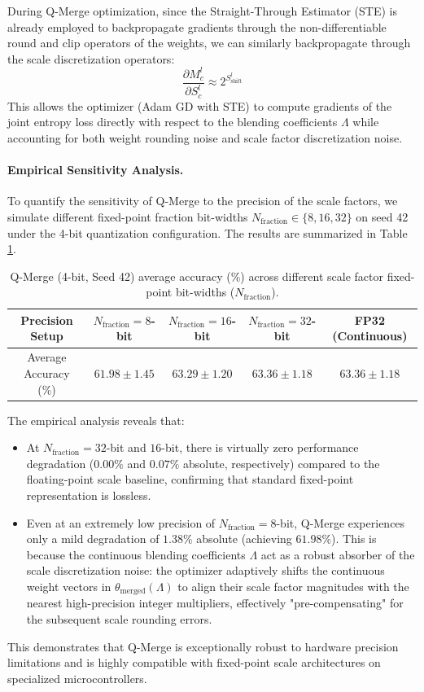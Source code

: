 During Q-Merge optimization, since the Straight-Through Estimator (STE) is already employed to backpropagate gradients through the non-differentiable $\text{round}$ and $\text{clip}$ operators of the weights, we can similarly backpropagate through the scale discretization operators:
\begin{equation}
    \frac{\partial M^l_c}{\partial S^l_c} \approx 2^{S^l_{\text{shift}}}
\end{equation}
This allows the optimizer (Adam GD with STE) to compute gradients of the joint entropy loss directly with respect to the blending coefficients $\Lambda$ while accounting for both weight rounding noise and scale factor discretization noise.

\paragraph{Empirical Sensitivity Analysis.}
To quantify the sensitivity of Q-Merge to the precision of the scale factors, we simulate different fixed-point fraction bit-widths $N_{\text{fraction}} \in \{8, 16, 32\}$ on seed 42 under the 4-bit quantization configuration. The results are summarized in Table \ref{tab:scale_sensitivity}.

\begin{table}[h]
\centering
\caption{Q-Merge (4-bit, Seed 42) average accuracy (\%) across different scale factor fixed-point bit-widths ($N_{\text{fraction}}$).}
\label{tab:scale_sensitivity}
\vskip 0.1in
\begin{tabular}{ccccc}
\toprule
\textbf{Precision Setup} & $N_{\text{fraction}} = 8$-bit & $N_{\text{fraction}} = 16$-bit & $N_{\text{fraction}} = 32$-bit & FP32 (Continuous) \\
\midrule
Average Accuracy (\%) & $61.98 \pm 1.45$ & $63.29 \pm 1.20$ & $63.36 \pm 1.18$ & $63.36 \pm 1.18$ \\
\bottomrule
\end{tabular}
\end{table}

The empirical analysis reveals that:
\begin{itemize}
    \item At $N_{\text{fraction}} = 32$-bit and $16$-bit, there is virtually zero performance degradation ($0.00\%$ and $0.07\%$ absolute, respectively) compared to the floating-point scale baseline, confirming that standard fixed-point representation is lossless.
    \item Even at an extremely low precision of $N_{\text{fraction}} = 8$-bit, Q-Merge experiences only a mild degradation of $1.38\%$ absolute (achieving $61.98\%$). This is because the continuous blending coefficients $\Lambda$ act as a robust absorber of the scale discretization noise: the optimizer adaptively shifts the continuous weight vectors in $\theta_{\text{merged}}(\Lambda)$ to align their scale factor magnitudes with the nearest high-precision integer multipliers, effectively "pre-compensating" for the subsequent scale rounding errors.
\end{itemize}
This demonstrates that Q-Merge is exceptionally robust to hardware precision limitations and is highly compatible with fixed-point scale architectures on specialized microcontrollers.

